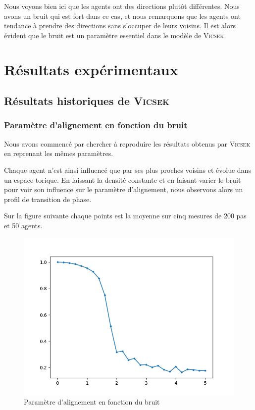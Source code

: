 \documentclass[french, a4paper, 12pt, openany]{report}
\begin{document}
	
Nous voyons bien ici que les agents ont des directions plutôt différentes. Nous avons un bruit qui est fort dans ce cas, et nous remarquons que les agents ont tendance à prendre des directions sans s'occuper de leurs voisins. Il est alors évident que le bruit est un paramètre essentiel dans le modèle de \textsc{Vicsek}.
   
\chapter{Résultats expérimentaux} \label{chap:resultats}
\section{Résultats historiques de \textsc{Vicsek}}
\subsection{Paramètre d'alignement en fonction du bruit} 
	Nous avons commencé par chercher à reproduire les résultats obtenus par \textsc{Vicsek} en reprenant les mêmes paramètres.
	
	Chaque agent n'est ainsi influencé que par ses plus proches voisins et évolue dans un espace torique. En laissant la densité constante et en faisant varier le bruit pour voir son influence sur le paramètre d'alignement, nous observons alors un profil de transition de phase.
	
	Sur la figure suivante chaque points est la moyenne sur cinq mesures de 200 pas et 50 agents.
	\begin{figure}[!h]
		\centering
		\includegraphics[width=12cm]{images/bruit_4.png}
		\caption{Paramètre d'alignement en fonction du bruit}
	\end{figure}
	
\end{document}
